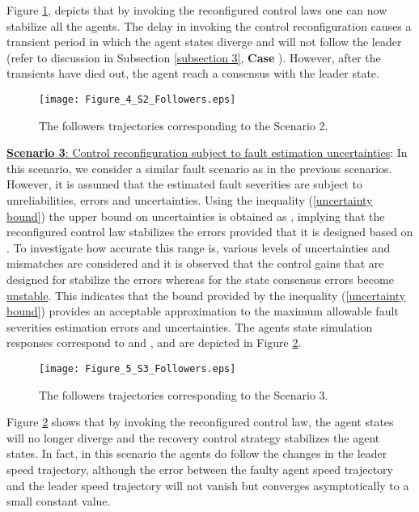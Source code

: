 \documentclass[12pt,draftcls,onecolumn]{IEEEtran}
\newcommand{\RNum}[1]{\uppercase\expandafter{\romannumeral #1\relax}}
\begin{document}
\par
   Figure \ref{followers trajectory S2}, depicts  that by invoking the reconfigured control laws one can now stabilize all the agents. 
   The delay in invoking the control reconfiguration causes a transient period in which the agent states diverge and will not follow the leader (refer to discussion in Subsection \ref{subsection 3}, \textbf{Case \RNum{5}}). However, after the transients have died out, the agent reach a consensus with the leader state.   \par
      \begin{figure}[thpb]
      \centering
            \texttt{[image: Figure\_4\_S2\_Followers.eps]}
      \caption{ The followers trajectories corresponding to the Scenario 2.}     
      \label{followers trajectory S2}
   \end{figure}    
  \underline{  \textbf{Scenario 3}: Control reconfiguration subject to fault estimation uncertainties}: In this scenario, we  consider a similar  fault scenario as in the previous scenarios. However, it is assumed that the estimated fault severities are subject to unreliabilities, errors and uncertainties. Using the inequality (\ref{uncertainty bound}) the upper bound on  uncertainties is obtained as , implying that  the reconfigured control law stabilizes the errors provided that it  is designed based on . To investigate  how accurate this range is, 
   various levels of uncertainties and mismatches are considered and it is observed that the control gains that are designed for   {} stabilize the errors whereas for {} the state consensus errors become \underline{unstable}. This indicates that the bound  provided by the inequality (\ref{uncertainty bound}) provides  an acceptable approximation to the maximum allowable fault severities estimation errors and uncertainties. The  agents state simulation responses correspond to 
  and , and are depicted in Figure \ref{followers trajectory S3}.\par
       \begin{figure}[thpb]
      \centering
            \texttt{[image: Figure\_5\_S3\_Followers.eps]}
      \caption{ The followers trajectories corresponding to the Scenario 3.}     
      \label{followers trajectory S3}
   \end{figure}  
 Figure \ref{followers trajectory S3} shows that by invoking the reconfigured control law, the agent states will no longer diverge and the recovery control strategy stabilizes the agent states. In fact, in this scenario the agents do follow the changes in the leader speed  trajectory, although the error between the faulty agent speed trajectory and the leader speed trajectory will not vanish but converges asymptotically to a small constant value. 
 
\end{document}
